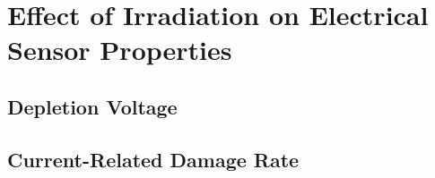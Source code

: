 \section{Effect of Irradiation on Electrical Sensor Properties}
\label{sec:irradiation}

\subsection{Depletion Voltage}
\label{subsec:irradiation_Vdep}

\subsection{Current-Related Damage Rate}
\label{subsec:irradiation_alpha}